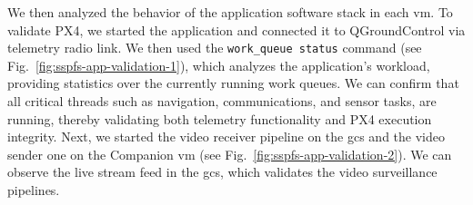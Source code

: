We then analyzed the behavior of the application software stack in each
\gls{vm}.
To validate PX4, we started the application and connected it to QGroundControl
via telemetry radio link. We then used the \lstinline{work_queue status}
command (see Fig.~\ref{fig:sspfs-app-validation-1}), which analyzes the application's workload, providing statistics over
the currently running work queues. We can confirm that all critical threads such
as navigation, communications, and sensor tasks, are running, 
thereby validating both telemetry functionality and PX4 execution integrity.
%
Next, we started the video receiver pipeline on the \gls{gcs} and the video
sender one on the Companion \gls{vm} (see Fig.~\ref{fig:sspfs-app-validation-2}). We can
observe the live stream feed in the \gls{gcs}, which validates the video
surveillance pipelines.


